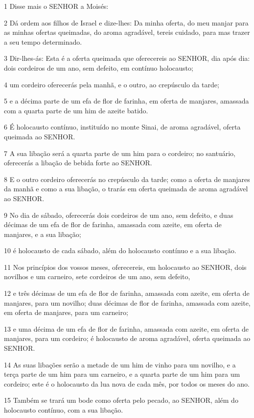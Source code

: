 \par 1 Disse mais o SENHOR a Moisés:
\par 2 Dá ordem aos filhos de Israel e dize-lhes: Da minha oferta, do meu manjar para as minhas ofertas queimadas, do aroma agradável, tereis cuidado, para mas trazer a seu tempo determinado.
\par 3 Dir-lhes-ás: Esta é a oferta queimada que oferecereis ao SENHOR, dia após dia: dois cordeiros de um ano, sem defeito, em contínuo holocausto;
\par 4 um cordeiro oferecerás pela manhã, e o outro, ao crepúsculo da tarde;
\par 5 e a décima parte de um efa de flor de farinha, em oferta de manjares, amassada com a quarta parte de um him de azeite batido.
\par 6 É holocausto contínuo, instituído no monte Sinai, de aroma agradável, oferta queimada ao SENHOR.
\par 7 A sua libação será a quarta parte de um him para o cordeiro; no santuário, oferecerás a libação de bebida forte ao SENHOR.
\par 8 E o outro cordeiro oferecerás no crepúsculo da tarde; como a oferta de manjares da manhã e como a sua libação, o trarás em oferta queimada de aroma agradável ao SENHOR.
\par 9 No dia de sábado, oferecerás dois cordeiros de um ano, sem defeito, e duas décimas de um efa de flor de farinha, amassada com azeite, em oferta de manjares, e a sua libação;
\par 10 é holocausto de cada sábado, além do holocausto contínuo e a sua libação.
\par 11 Nos princípios dos vossos meses, oferecereis, em holocausto ao SENHOR, dois novilhos e um carneiro, sete cordeiros de um ano, sem defeito,
\par 12 e três décimas de um efa de flor de farinha, amassada com azeite, em oferta de manjares, para um novilho; duas décimas de flor de farinha, amassada com azeite, em oferta de manjares, para um carneiro;
\par 13 e uma décima de um efa de flor de farinha, amassada com azeite, em oferta de manjares, para um cordeiro; é holocausto de aroma agradável, oferta queimada ao SENHOR.
\par 14 As suas libações serão a metade de um him de vinho para um novilho, e a terça parte de um him para um carneiro, e a quarta parte de um him para um cordeiro; este é o holocausto da lua nova de cada mês, por todos os meses do ano.
\par 15 Também se trará um bode como oferta pelo pecado, ao SENHOR, além do holocausto contínuo, com a sua libação.
